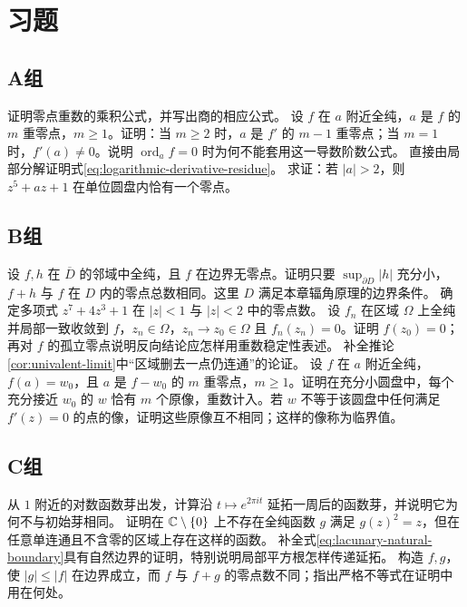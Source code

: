 \section*{习题}

\subsection*{A组}
\begin{enumerate}[label=\textbf{\thechapter.\arabic*.}]
证明零点重数的乘积公式，并写出商的相应公式。
设 $f$ 在 $a$ 附近全纯，$a$ 是 $f$ 的 $m$ 重零点，$m\ge1$。证明：当 $m\ge2$ 时，$a$ 是 $f'$ 的 $m-1$ 重零点；当 $m=1$ 时，$f'(a)\ne0$。说明 $\operatorname{ord}_a f=0$ 时为何不能套用这一导数阶数公式。
直接由局部分解证明式\eqref{eq:logarithmic-derivative-residue}。
求证：若 $|a|>2$，则 $z^5+az+1$ 在单位圆盘内恰有一个零点。
\end{enumerate}

\subsection*{B组}
\begin{enumerate}[label=\textbf{\thechapter.\arabic*.},resume]
设 $f,h$ 在 $\overline D$ 的邻域中全纯，且 $f$ 在边界无零点。证明只要 $\sup_{\partial D}|h|$ 充分小，$f+h$ 与 $f$ 在 $D$ 内的零点总数相同。这里 $D$ 满足本章辐角原理的边界条件。
确定多项式 $z^7+4z^3+1$ 在 $|z|<1$ 与 $|z|<2$ 中的零点数。
设 $f_n$ 在区域 $\Omega$ 上全纯并局部一致收敛到 $f$，$z_n\in\Omega$，$z_n\to z_0\in\Omega$ 且 $f_n(z_n)=0$。证明 $f(z_0)=0$；再对 $f$ 的孤立零点说明反向结论应怎样用重数稳定性表述。
补全推论\ref{cor:univalent-limit}中“区域删去一点仍连通”的论证。
设 $f$ 在 $a$ 附近全纯，$f(a)=w_0$，且 $a$ 是 $f-w_0$ 的 $m$ 重零点，$m\ge1$。证明在充分小圆盘中，每个充分接近 $w_0$ 的 $w$ 恰有 $m$ 个原像，重数计入。若 $w$ 不等于该圆盘中任何满足 $f'(z)=0$ 的点的像，证明这些原像互不相同；这样的像称为临界值。
\end{enumerate}

\subsection*{C组}
\begin{enumerate}[label=\textbf{\thechapter.\arabic*.},resume]
从 $1$ 附近的对数函数芽出发，计算沿 $t\mapsto e^{2\pi i t}$ 延拓一周后的函数芽，并说明它为何不与初始芽相同。
证明在 $\mathbb{C}\setminus\{0\}$ 上不存在全纯函数 $g$ 满足 $g(z)^2=z$，但在任意单连通且不含零的区域上存在这样的函数。
补全式\eqref{eq:lacunary-natural-boundary}具有自然边界的证明，特别说明局部平方根怎样传递延拓。
构造 $f,g$，使 $|g|\le|f|$ 在边界成立，而 $f$ 与 $f+g$ 的零点数不同；指出严格不等式在证明中用在何处。
\end{enumerate}
